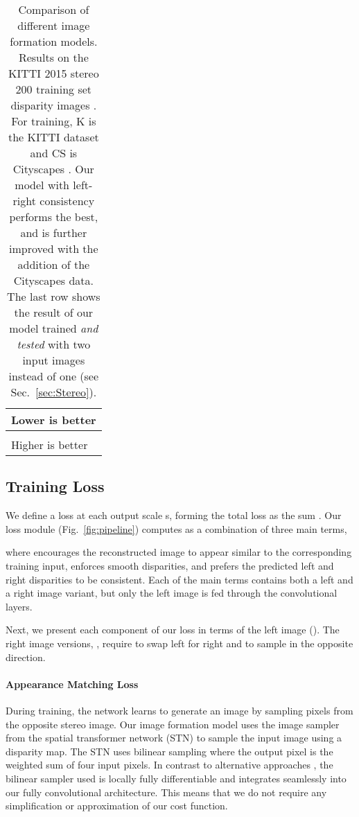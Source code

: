 \documentclass[10pt,twocolumn,letterpaper]{article}
\begin{document}
\begin{table*}[!h]
{  \begin{tabular}{|l|}
    \hline
      \cellcolor{col1} Lower is better\\ \hline
      \\ \hline
      \cellcolor{col2} Higher is better\\ \hline   
  \end{tabular}
  }
  \vspace{10pt}
    \caption{Comparison of different image formation models. 
  Results on the KITTI 2015 stereo 200 training set disparity images \cite{Geiger2012CVPR}. 
  For training, K is the KITTI dataset \cite{Geiger2012CVPR} and CS is Cityscapes \cite{Cordts2016Cityscapes}.
  Our model with left-right consistency performs the best, and is further improved with the addition of the Cityscapes data. 
  The last row shows the result of our model trained \emph{and tested} with two input images instead of one (see Sec.~\ref{sec:Stereo}).}
    \label{tab:kitti_official}
    \vspace{-10pt}
\end{table*}

\subsection{Training Loss}
We define a loss  at each output scale s, forming the total loss as the sum .
Our loss module (Fig.~\ref{fig:pipeline}) computes  as a combination of three main terms, 

where  encourages the reconstructed image to appear similar to the corresponding training input,  enforces smooth disparities, and  prefers the predicted left and right disparities to be consistent. Each of the main terms contains both a left and a right image variant, but only the left image is fed through the convolutional layers. 

Next, we present each component of our loss in terms of the left image (\eg ). The right image versions, \eg , require to swap left for right and to sample in the opposite direction.

\paragraph*{Appearance Matching Loss}
During training, the network learns to generate an image by sampling pixels from the opposite stereo image. 
Our image formation model uses the image sampler from the spatial transformer network (STN) \cite{jaderberg2015spatial} to sample the input image using a disparity map. 
The STN uses bilinear sampling where the output pixel is the weighted sum of four input pixels. 
In contrast to alternative approaches \cite{garg2016unsupervised,xie2016deep3d}, the bilinear sampler used is locally fully differentiable and integrates seamlessly into our fully convolutional architecture.
This means that we do not require any simplification or approximation of our cost function.
\end{document}
